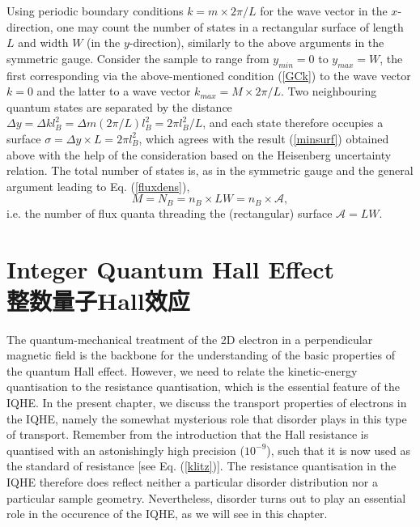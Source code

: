 \documentclass[10pt]{book}
\newcommand{\Amath}{\mathcal{A}}
\begin{document}
Using periodic boundary conditions $k=m\times 2\pi/L$ for the wave vector in the $x$-direction, one may count the number of states
in a rectangular surface of length $L$ and width $W$ (in the $y$-direction), similarly to the above arguments in the symmetric
gauge. Consider the sample to range from $y_{min}=0$ to 
$y_{max}=W$, the first corresponding via the above-mentioned condition (\ref{GCk}) to the wave vector $k=0$ and the latter to
a wave vector $k_{max}=M \times 2\pi/L$. Two neighbouring quantum states are separated by the distance 
$\Delta y=\Delta k l_B^2=\Delta m (2\pi/L) l_B^2 = 2\pi l_B^2/L$, 
and each state therefore occupies a surface $\sigma=\Delta y\times L=2\pi l_B^2$, which agrees with the result (\ref{minsurf}) obtained 
above with the help of the consideration based on the Heisenberg uncertainty relation. 
The total number of states is, as in the symmetric gauge and the general argument leading to Eq. (\ref{fluxdens}),
$$M=N_B= n_B\times LW = n_B \times \Amath,$$
i.e. the number of flux quanta threading the (rectangular) surface $\Amath=LW$.


\chapter[整数量子Hall效应]{Integer Quantum Hall Effect\\\bf 整数量子Hall效应}
\label{IQHE}


The quantum-mechanical treatment of the 2D electron in a perpendicular magnetic field is the backbone for the understanding of
the basic properties of the quantum Hall effect. However, we need to relate the kinetic-energy quantisation to the resistance 
quantisation, which is the essential feature of the IQHE. In the present chapter, we discuss the transport properties of 
electrons in the IQHE, namely the somewhat mysterious role that disorder plays in this type of transport. Remember from the
introduction that the Hall resistance is quantised with an astonishingly high precision ($10^{-9}$), such that it
is now used as the standard of resistance [see Eq. (\ref{klitz})]. The resistance quantisation in the IQHE therefore does reflect 
neither a particular disorder distribution nor a particular sample geometry. Nevertheless, disorder turns out to play an
essential role in the occurence of the IQHE, as we will see in this chapter. 
\end{document}
